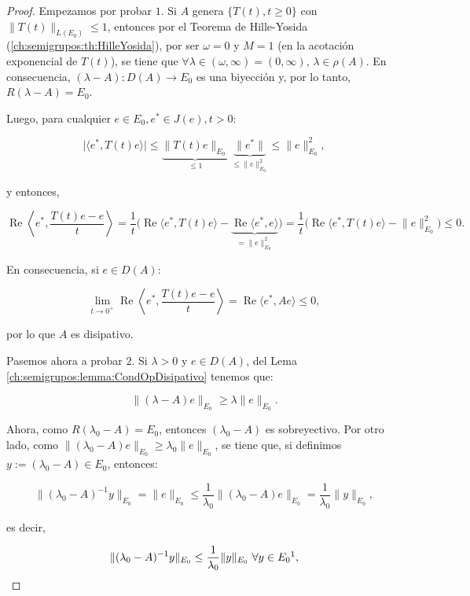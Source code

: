 \begin{proof}
    Empezamos por probar $1$. Si $A$ genera $\{T(t), t \geq 0\}$ con $\lVert T(t) \rVert_{L(E_0)} \leq 1$, entonces por el Teorema de Hille-Yosida (\ref{ch:semigrupos:th:HilleYosida}), por ser $\omega = 0$ y $M = 1$ (en la acotación exponencial de $T(t)$), se tiene que $\forall \lambda \in (\omega, \infty) = (0, \infty), \, \lambda \in \rho(A)$. En consecuencia, $(\lambda - A) : D(A) \rightarrow E_0$ es una biyección y, por lo tanto, $R(\lambda - A) = E_0$.

    Luego, para cualquier $e \in E_0, e^* \in J(e), t > 0$:

    \[\big |\langle e^*, T(t)e \rangle \big | \leq \underbrace{\lVert T(t)e \rVert_{E_0}}_{\leq 1} \ \underbrace{\lVert e^* \rVert}_{\leq \lVert e \rVert^2_{E_0}} \leq \lVert e \rVert^2_{E_0},\]

    y entonces,

    \[\operatorname{Re}\left \langle e^*, \frac{T(t)e - e}{t} \right \rangle = \frac{1}{t}\big( \operatorname{Re}\langle e^*, T(t)e \rangle - \underbrace{\operatorname{Re}\langle e^*, e\rangle}_{= \lVert e \rVert^2_{E_0}} \big) = \frac{1}{t}\big( \operatorname{Re}\langle e^*, T(t)e \rangle - \lVert e \rVert^2_{E_0} \big) \leq 0.\]

    En consecuencia, si $e \in D(A)$:

    \[\lim_{t \rightarrow 0^+} \operatorname{Re} \left \langle e^*, \frac{T(t)e - e}{t} \right \rangle = \operatorname{Re} \langle e^*, Ae \rangle \leq 0,\]

    por lo que $A$ es disipativo.

    Pasemos ahora a probar $2$. Si $\lambda > 0$ y $e \in D(A)$, del Lema \ref{ch:semigrupos:lemma:CondOpDisipativo} tenemos que:

    \[\lVert (\lambda - A)e \rVert_{E_0} \geq \lambda \lVert e \rVert_{E_0}.\]

    Ahora, como $R(\lambda_0 - A) = E_0$, entonces $(\lambda_0 - A)$ es sobreyectivo. Por otro lado, como $\lVert (\lambda_0 - A)e \rVert_{E_0} \geq \lambda_0 \lVert e \rVert_{E_0}$, se tiene que, si definimos $y := (\lambda_0 -A) \in E_0$, entonces:

    \[\lVert (\lambda_0 - A)^{-1}y \rVert_{E_0} = \lVert e \rVert_{E_0} \leq \frac{1}{\lambda_0}\lVert (\lambda_0 - A)e \rVert_{E_0} = \frac{1}{\lambda_0} \lVert y \rVert_{E_0},\]

    es decir,

    \[\lVert (\lambda_0 - A)^{-1}y\rVert_{E_0} \leq \frac{1}{\lambda_0}\lVert y \rVert_{E_0} \ \forall y \in E_0\footnotemark,\]


\end{proof}
